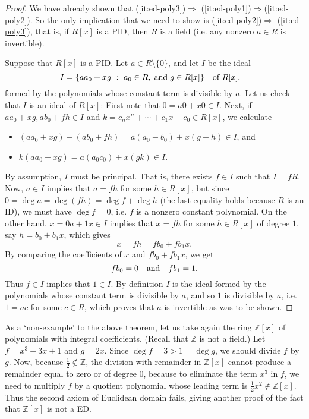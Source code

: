 \documentclass[12pt]{article}
\newcommand{\qbox}[1]{\quad\hbox{#1}\quad}
\def\dst{\displaystyle}
\theoremstyle{definition}
\newcounter{ex}\renewcommand\theex{\arabic{ex}}
\newcommand{\Z}{\ensuremath{\mathbb{Z}}}
\begin{document}
\begin{proof}
We have already shown that
(\ref{it:ed-poly3})$\Longrightarrow$
(\ref{it:ed-poly1})$\Longrightarrow$(\ref{it:ed-poly2}).
So the only implication that we need to show is 
(\ref{it:ed-poly2})$\Longrightarrow$
(\ref{it:ed-poly3}), that is, if $R[x]$ is a PID, then $R$ is a field
(i.e. any nonzero $a\in R$ is invertible).

Suppose that $R[x]$ is a PID. Let $a\in R\setminus\{0\}$, and let
$I$ be the ideal
$$I=\{aa_0+xg~:~a_0\in R,\;\hbox{and}\;g\in R[x]\}\qbox{of $R[x]$,}$$
formed by the polynomials whose constant term is
divisible by $a$.
Let us check that $I$ is an ideal of $R[x]$: First note that
$0=a0+x0\in I$. Next, if $aa_0+xg,ab_0+fh\in I$
and $k=c_nx^n+\cdots+c_1x+c_0\in R[x]$, we calculate
\begin{itemize}\item
$(aa_0+xg)-(ab_0+fh)=a(a_0-b_0)+x(g-h)\in I$, and
\item
$k(aa_0-xg)=a(a_0c_0)+x(gk)\in I$.
\end{itemize}
By assumption, $I$ must be principal. That is, there
exists $f\in I$ such that $I=fR$. Now, $a\in I$ implies that
$a=fh$ for some $h\in R[x]$, but since $0=\deg a=\deg(fh)=\deg f+\deg h$
(the last equality holds because $R$ is an ID), we must have
$\deg f=0$, i.e. $f$ is a nonzero constant polynomial.
On the other hand,
$x=0a+1x\in I$ implies that $x=fh$ for some $h\in R[x]$ of degree $1$,
say $h=b_0+b_1x$, which gives
$$x=fh=fb_0+fb_1x.$$
By comparing the coefficients of $x$ and $fb_0+fb_1x$, we get
$$fb_0=0\qbox{and}fb_1=1.$$
Thus $f\in I$ implies that $1\in I$.
By definition $I$ is the ideal formed by the polynomials whose
constant term is divisible by $a$, and so $1$ is
divisible by $a$, i.e. $1=ac$ for some $c\in R$, which proves that $a$
is invertible as was to be shown. 
\end{proof}

As a `non-example' to the above theorem, let us take again the ring
$\Z[x]$ of polynomials with integral coefficients. (Recall that $\Z$ is
not a field.) Let $f=x^3-3x+1$ and
$g=2x$. Since $\deg f=3>1=\deg g$, we should divide $f$ by $g$. Now,
because $\dst\frac12\notin\Z$, the division with remainder in $\Z[x]$
cannot produce a remainder equal to zero or of degree $0$, because to
eliminate the term $x^3$ in $f$, we need to multiply $f$ by a quotient
polynomial whose leading term is $\dst\frac12x^2\notin\Z[x]$.
Thus the second axiom of Euclidean domain fails, giving another proof
of the fact that $\Z[x]$ is not a ED. 
\end{document}
